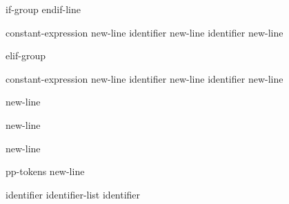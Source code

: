 \begin{bnf}
\br
    if-group   endif-line
\end{bnf}

\begin{bnf}
\br
     constant-expression new-line \br
     identifier new-line \br
     identifier new-line 
\end{bnf}

\begin{bnf}
\br
    elif-group 
\end{bnf}

\begin{bnf}
\br
     constant-expression new-line \br
     identifier new-line \br
     identifier new-line 
\end{bnf}

\begin{bnf}
\br
     new-line 
\end{bnf}

\begin{bnf}
\br
     new-line
\end{bnf}

\begin{bnf}
\br
     new-line
\end{bnf}

\begin{bnf}
\br
    pp-tokens new-line
\end{bnf}

\begin{bnf}
\br
\end{bnf}

\begin{bnf}
\br
    identifier\br
    identifier-list \terminal{,} identifier
\end{bnf}

\begin{bnf}
\br
\end{bnf}

